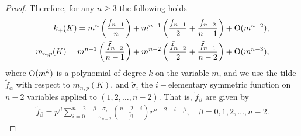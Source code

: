 \documentclass[11pt,a4paper,times]{amsart}
\theoremstyle{plain}
\theoremstyle{definition}
\numberwithin{equation}{section}
\newcommand{\bo}{{\rm O}}
\newcommand{\ds}{\displaystyle}
\newcommand{\dsum}{\ds\sum}
\newcommand{\fr}[2]{\frac{\ds #1}{\ds #2}}
\begin{document}
{\begin{proof}
 Therefore, for any  $n\geq 3$ the following holds
\begin{eqnarray}\label{kmais2}
k_+(K) =  m^{n}\left(\frac{f_{n-1}}{n}\right) +m^{n-1}\left(\frac{f_{n-1}}{2}+\frac{f_{n-2}}{n-1}\right) +\bo(m^{n-2}),\\
\label{tilde2term}
m_{n,p}(K) = m^{n-1}\left(\frac{\tilde{f}_{n-2}}{n-1}\right) +m^{n-2}\left(\frac{\tilde{f}_{n-2}}{2}+\frac{\tilde{f}_{n-1}}{n-2}\right) +{\bo(m^{n-3})},
\end{eqnarray}
where $\bo(m^{k})$ is a polynomial of degree ${k}$ on the variable $m$, and  we use the tilde $\tilde{f}_{\alpha}$  with respect to
$m_{n,p}(K)$, and 
  $\tilde{\sigma}_i$ the $i-$elementary symmetric function on $n-2$ variables applied to $(1,2, \ldots, n-2)$. That is,  $\tilde{f}_{\beta}$ are given by
\[\begin{array}{l}
\tilde{f}_{\beta}=p^{\beta}\dsum_{i=0}^{n-2-\beta}
 \fr{\tilde{\sigma}_i}{\tilde{\sigma}_{n-2}}\binom{n-2-i}{\tilde{\beta}} r^{n-2-i-\beta}, \quad \beta=0,1, 2, \ldots, n-2.
 \end{array}\]


\end{proof}}
\end{document}
